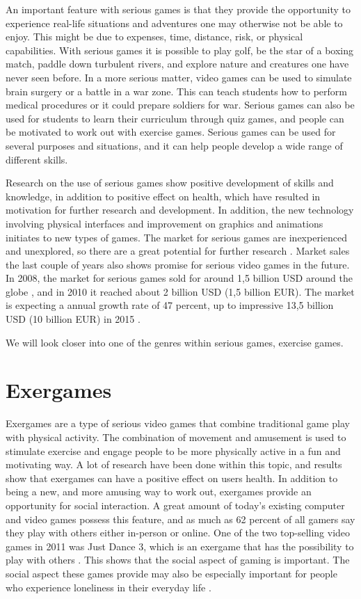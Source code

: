 An important feature with serious games is that they provide the opportunity to experience real-life situations and adventures one may otherwise not be able to enjoy. This might be due to expenses, time, distance, risk, or physical capabilities. With serious games it is possible to play golf, be the star of a boxing match, paddle down turbulent rivers, and explore nature and creatures one have never seen before. In a more serious matter, video games can be used to simulate brain surgery or a battle in a war zone. This can teach students how to perform medical procedures or it could prepare soldiers for war. Serious games can also be used for students to learn their curriculum through quiz games, and people can be motivated to work out with exercise games. Serious games can be used for several purposes and situations, and it can help people develop a wide range of different skills. 

Research on the use of serious games show positive development of skills and knowledge, in addition to positive effect on health, which have resulted in motivation for further research and development. In addition, the new technology involving physical interfaces and improvement on graphics and animations initiates to new types of games. The market for serious games are inexperienced and unexplored, so there are a great potential for further research \cite{alfingewang}. Market sales the last couple of years also shows promise for serious video games in the future. In 2008, the market for serious games sold for around 1,5 billion USD around the globe \cite{alfingewang}, and in 2010 it reached about 2 billion USD (1,5 billion EUR). The market is expecting a annual growth rate of 47 percent, up to impressive 13,5 billion USD (10 billion EUR) in 2015 \cite{idate}. 

We will look closer into one of the genres within serious games, exercise games.  

\section{Exergames}
\label{sec:exergames}
Exergames are a type of serious video games that combine traditional game play with physical activity. The combination of movement and amusement is used to stimulate exercise and engage people to be more physically active in a fun and motivating way. A lot of research have been done within this topic, and results show that exergames can have a positive effect on users health. In addition to being a new, and more amusing way to work out, exergames provide an opportunity for social interaction. A great amount of today's existing computer and video games possess this feature, and as much as 62 percent of all gamers say they play with others either in-person or online. One of the two top-selling video games in 2011 was Just Dance 3, which is an exergame that has the possibility to play with others \cite{statistics2012}. This shows that the social aspect of gaming is important. The social aspect these games provide may also be especially important for people who experience loneliness in their everyday life \cite{exergamesforelderly}.

